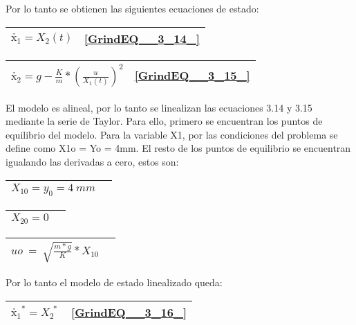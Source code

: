 \documentclass{article} %
\begin{document}
\noindent 

\noindent Por lo tanto se obtienen las siguientes ecuaciones de estado:

\noindent 

\noindent 

\begin{tabular}{|p{3.9in}|p{0.4in}|} \hline 
${\textrm{ẋ}}_1=X_2(t)$ & \eqref{GrindEQ__3_14_}  \\ \hline 
\end{tabular}



\begin{tabular}{|p{3.9in}|p{0.4in}|} \hline 
${\textrm{ẋ}}_2=g-\frac{K}{m}*(\frac{u}{X_1(t)})^2$ & \eqref{GrindEQ__3_15_}  \\ \hline 
\end{tabular}



\noindent El modelo es alineal, por lo tanto se linealizan las ecuaciones 3.14 y 3.15 mediante la serie de Taylor. Para ello, primero se encuentran los puntos de equilibrio del modelo. Para la variable X1, por las condiciones del problema se define como X1o = Yo = 4mm. El resto de los puntos de equilibrio se encuentran igualando las derivadas a cero, estos son:

\noindent 

\begin{tabular}{|p{3.9in}|p{0.5in}|} \hline 
$X_{10}=y_0=4\ mm$ &  \\ \hline 
\end{tabular}



\begin{tabular}{|p{3.9in}|p{0.4in}|} \hline 
$X_{20}=0$ &   \\ \hline 
\end{tabular}



\begin{tabular}{|p{3.9in}|p{0.5in}|} \hline 
$uo\ =\ \sqrt{\frac{m*g}{K}}*X_{10}$ &   \\ \hline 
\end{tabular}



\noindent Por lo tanto el modelo de estado linealizado queda:

 

\begin{tabular}{|p{3.9in}|p{0.4in}|} \hline 
${{\textrm{ẋ}}_1}^*=X^{\ \ *}_2\ $ & \eqref{GrindEQ__3_16_}  \\ \hline 
\end{tabular}
\end{document}
